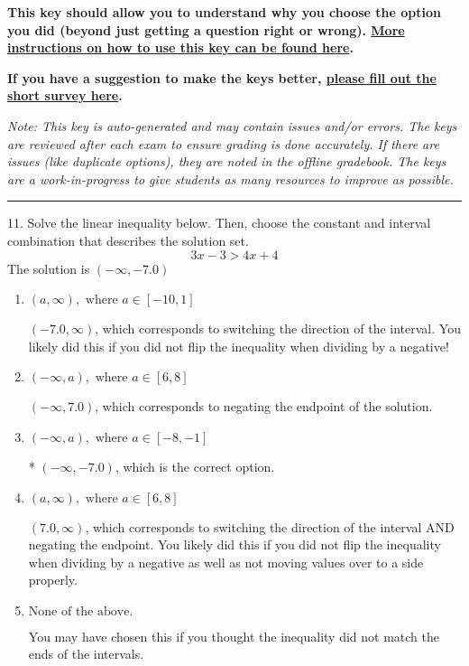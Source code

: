 \documentclass{article}[14pt]
\begin{document}
\textbf{This key should allow you to understand why you choose the option you did (beyond just getting a question right or wrong). \href{https://xronos.clas.ufl.edu/mac1105spring2020/courseDescriptionAndMisc/Exams/LearningFromResults}{More instructions on how to use this key can be found here}.}

\textbf{If you have a suggestion to make the keys better, \href{https://forms.gle/CZkbZmPbC9XALEE88}{please fill out the short survey here}.}

\textit{Note: This key is auto-generated and may contain issues and/or errors. The keys are reviewed after each exam to ensure grading is done accurately. If there are issues (like duplicate options), they are noted in the offline gradebook. The keys are a work-in-progress to give students as many resources to improve as possible.}

\rule{\textwidth}{0.4pt}

11. Solve the linear inequality below. Then, choose the constant and interval combination that describes the solution set.
$$ 3x -3 > 4x + 4 $$ 
The solution is $ (-\infty, -7.0) $ 

\begin{enumerate}[label=\Alph*.] 
\item $ (a, \infty), \text{ where } a \in [-10, 1] $ 

  $(-7.0, \infty)$, which corresponds to switching the direction of the interval. You likely did this if you did not flip the inequality when dividing by a negative! 
\item $ (-\infty, a), \text{ where } a \in [6, 8] $ 

  $(-\infty, 7.0)$, which corresponds to negating the endpoint of the solution. 
\item $ (-\infty, a), \text{ where } a \in [-8, -1] $ 

 * $(-\infty, -7.0)$, which is the correct option. 
\item $ (a, \infty), \text{ where } a \in [6, 8] $ 

  $(7.0, \infty)$, which corresponds to switching the direction of the interval AND negating the endpoint. You likely did this if you did not flip the inequality when dividing by a negative as well as not moving values over to a side properly. 
\item $ \text{None of the above}. $ 

 You may have chosen this if you thought the inequality did not match the ends of the intervals. 
\end{enumerate} 
 
\end{document}
